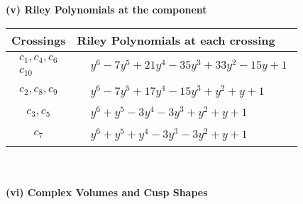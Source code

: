 \documentclass[1p]{elsarticle_modified}
\theoremstyle{definition}
\begin{document}
\newpage\renewcommand{\arraystretch}{1}
\flushleft \textbf{(v) Riley Polynomials at the component}\newline \\
\begin{tabular}{m{50pt}|m{274pt}}
Crossings & \hspace{64pt}Riley Polynomials at each crossing \\
\hline $$\begin{aligned}c_{1},c_{4},c_{6}\\c_{10}\end{aligned}$$&$\begin{aligned}
&y^6-7 y^5+21 y^4-35 y^3+33 y^2-15 y+1
\end{aligned}$\\
\hline $$\begin{aligned}c_{2},c_{8},c_{9}\end{aligned}$$&$\begin{aligned}
&y^6-7 y^5+17 y^4-15 y^3+y^2+y+1
\end{aligned}$\\
\hline $$\begin{aligned}c_{3},c_{5}\end{aligned}$$&$\begin{aligned}
&y^6+y^5-3 y^4-3 y^3+y^2+y+1
\end{aligned}$\\
\hline $$\begin{aligned}c_{7}\end{aligned}$$&$\begin{aligned}
&y^6+y^5+y^4-3 y^3-3 y^2+y+1
\end{aligned}$\\
\hline
\end{tabular}\\~\\
\newpage\flushleft \textbf{(vi) Complex Volumes and Cusp Shapes}
\end{document}
